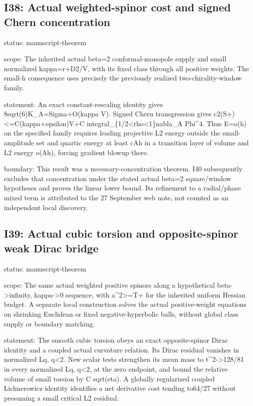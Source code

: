 \documentclass[
  10pt,
]{article}
\begin{document}
\hypertarget{i38-actual-weighted-spinor-cost-and-signed-chern-concentration}{%
\subsection{I38: Actual weighted-spinor cost and signed Chern
concentration}\label{i38-actual-weighted-spinor-cost-and-signed-chern-concentration}}

status: manuscript-theorem

scope: The inherited actual beta=2 conformal-monopole supply and small
normalized kappa=r+D2/V, with its fixed class through all positive
weights. The small-h consequence uses precisely the previously realized
two-chirality-window family.

statement: An exact constant-rescaling identity gives
8sqrt(6)K\_A=Sigma+O(kappa V). Signed Chern transgression gives
c2(S+)\textless=C(kappa+epsilon)V+C
integral\_\{1/2\textless rho\textless1\}\textbar nabla\_A
Phi\textbar\^{}4. Thus E=o(h) on the specified family requires leading
projective L2 energy outside the small-amplitude set and quartic energy
at least cAh in a transition layer of volume and L2 energy o(Ah),
forcing gradient blowup there.

boundary: This result was a necessary-concentration theorem. I40
subsequently excludes that concentration under the stated actual beta=2
square/window hypotheses and proves the linear lower bound. Its
refinement to a radial/phase mixed term is attributed to the 27
September web note, not counted as an independent local discovery.

\hypertarget{i39-actual-cubic-torsion-and-opposite-spinor-weak-dirac-bridge}{%
\subsection{I39: Actual cubic torsion and opposite-spinor weak Dirac
bridge}\label{i39-actual-cubic-torsion-and-opposite-spinor-weak-dirac-bridge}}

status: manuscript-theorem

scope: The same actual weighted positive spinors along a hypothetical
beta-\textgreater infinity, kappa-\textgreater0 sequence, with
a\^{}2\textgreater=T+ for the inherited uniform Hessian budget. A
separate local construction solves the actual positive-weight equations
on shrinking Euclidean or fixed negative-hyperbolic balls, without
global class supply or boundary matching.

statement: The smooth cubic torsion obeys an exact opposite-spinor Dirac
identity and a coupled actual curvature relation. Its Dirac residual
vanishes in normalized Lq, q\textless2. New scalar tests strengthen its
mean mass to \textbar t\textbar\^{}2-\textgreater128/81 in every
normalized Lq, q\textless2, at the zero endpoint, and bound the relative
volume of small torsion by C sqrt(eta). A globally regularized coupled
Lichnerowicz identity identifies a net derivative cost tending to64/27
without presuming a small critical L2 residual.
\end{document}

